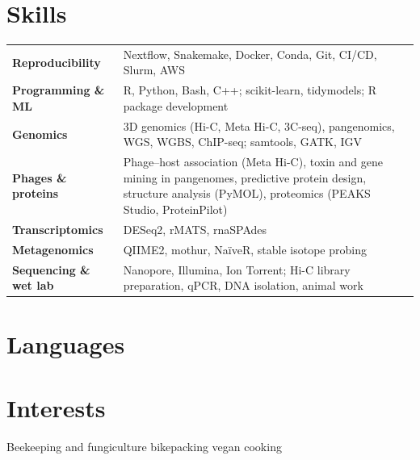 \documentclass[]{deedy-resume-openfont}
\begin{document}
\section{Skills}
{\small
\begin{tabular}{@{}p{}p{}@{}}
\textbf{Reproducibility} & Nextflow, Snakemake, Docker, Conda, Git, CI/CD, Slurm, AWS \\[2pt]
\textbf{Programming \& ML} & R, Python, Bash, C++; scikit-learn, tidymodels; R package development \\[2pt]
\textbf{Genomics} & 3D genomics (Hi-C, Meta Hi-C, 3C-seq), pangenomics, WGS, WGBS, ChIP-seq; samtools, GATK, IGV \\[2pt]
\textbf{Phages \& proteins} & Phage--host association (Meta Hi-C), toxin and gene mining in pangenomes, predictive protein design, structure analysis (PyMOL), proteomics (PEAKS Studio, ProteinPilot) \\[2pt]
\textbf{Transcriptomics} & DESeq2, rMATS, rnaSPAdes \\[2pt]
\textbf{Metagenomics} & QIIME2, mothur, NaïveR, stable isotope probing \\[2pt]
\textbf{Sequencing \& wet lab} & Nanopore, Illumina, Ion Torrent; Hi-C library preparation, qPCR, DNA isolation, animal work \\
\end{tabular}
}

\section{Languages}
{\small \LanguagesLine{}\par}

\section{Interests}
{\small Beekeeping and fungiculture \textbullet{} bikepacking \textbullet{} vegan cooking\par}

\vspace{14pt}
\noindent{\tiny \GdprNotice{}}
\end{document}
